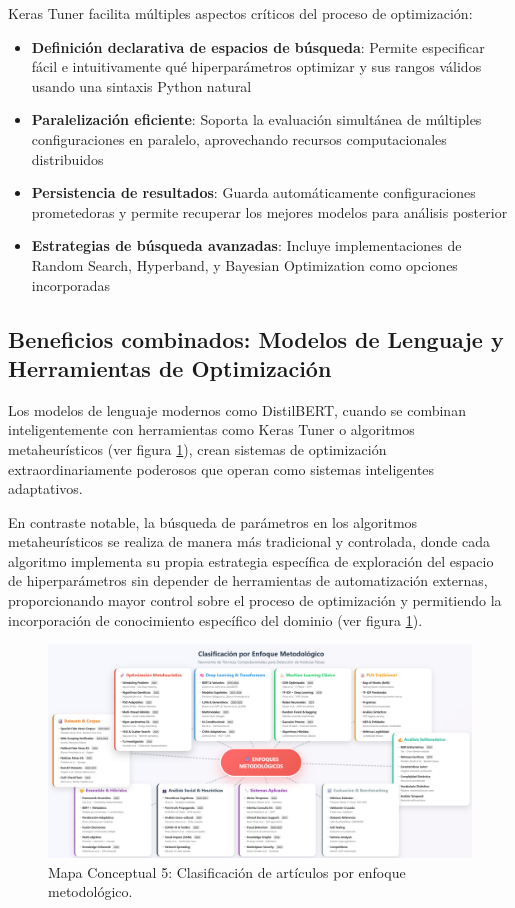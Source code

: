 Keras Tuner facilita múltiples aspectos críticos del proceso de optimización:

\begin{itemize}
    \item \textbf{Definición declarativa de espacios de búsqueda}: Permite especificar fácil e intuitivamente qué hiperparámetros optimizar y sus rangos válidos usando una sintaxis Python natural
    \item \textbf{Paralelización eficiente}: Soporta la evaluación simultánea de múltiples configuraciones en paralelo, aprovechando recursos computacionales distribuidos
    \item \textbf{Persistencia de resultados}: Guarda automáticamente configuraciones prometedoras y permite recuperar los mejores modelos para análisis posterior
    \item \textbf{Estrategias de búsqueda avanzadas}: Incluye implementaciones de Random Search, Hyperband, y Bayesian Optimization como opciones incorporadas
\end{itemize}

\subsection{Beneficios combinados: Modelos de Lenguaje y Herramientas de Optimización}

Los modelos de lenguaje modernos como DistilBERT, cuando se combinan inteligentemente con herramientas como Keras Tuner o algoritmos metaheurísticos (ver figura \ref{fig:mapa_conceptual_5}), crean sistemas de optimización extraordinariamente poderosos que operan como sistemas inteligentes adaptativos.

En contraste notable, la búsqueda de parámetros en los algoritmos metaheurísticos se realiza de manera más tradicional y controlada, donde cada algoritmo implementa su propia estrategia específica de exploración del espacio de hiperparámetros sin depender de herramientas de automatización externas, proporcionando mayor control sobre el proceso de optimización y permitiendo la incorporación de conocimiento específico del dominio (ver figura \ref{fig:mapa_conceptual_5}).

\begin{figure}[h!]
    \centering
    \includegraphics[width=\textwidth]{Imagenes/mapaConceptual5.png}
    \caption{Mapa Conceptual 5: Clasificación de artículos por enfoque metodológico.}
    \label{fig:mapa_conceptual_5}
\end{figure}

